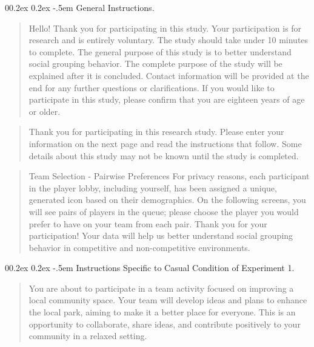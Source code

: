 \documentclass[
  man,
  floatsintext,
  longtable,
  nolmodern,
  notxfonts,
  notimes,
  draftfirst,
  colorlinks=true,linkcolor=blue,citecolor=blue,urlcolor=blue]{apa7}
\makeatletter
\renewcommand{\paragraph}{\@startsection{paragraph}{4}{\parindent}%
	{0\baselineskip \@plus 0.2ex \@minus 0.2ex}%
	{-.5em}%
	{\normalfont\normalsize\bfseries\typesectitle}}
\makeatother
\begin{document}
\paragraph{General Instructions.}\label{general-instructions}

\begin{quote}
Hello! Thank you for participating in this study. Your participation is
for research and is entirely voluntary. The study should take under 10
minutes to complete. The general purpose of this study is to better
understand social grouping behavior. The complete purpose of the study
will be explained after it is concluded. Contact information will be
provided at the end for any further questions or clarifications. If you
would like to participate in this study, please confirm that you are
eighteen years of age or older.
\end{quote}

\begin{quote}
Thank you for participating in this research study. Please enter your
information on the next page and read the instructions that follow. Some
details about this study may not be known until the study is completed.
\end{quote}

\begin{quote}
Team Selection - Pairwise Preferences For privacy reasons, each
participant in the player lobby, including yourself, has been assigned a
unique, generated icon based on their demographics. On the following
screens, you will see pairs of players in the queue; please choose the
player you would prefer to have on your team from each pair. Thank you
for your participation! Your data will help us better understand social
grouping behavior in competitive and non-competitive environments.
\end{quote}

\paragraph{Instructions Specific to Casual Condition of Experiment
1.}\label{instructions-specific-to-casual-condition-of-experiment-1}

\begin{quote}
You are about to participate in a team activity focused on improving a
local community space. Your team will develop ideas and plans to enhance
the local park, aiming to make it a better place for everyone. This is
an opportunity to collaborate, share ideas, and contribute positively to
your community in a relaxed setting.
\end{quote}
\end{document}
